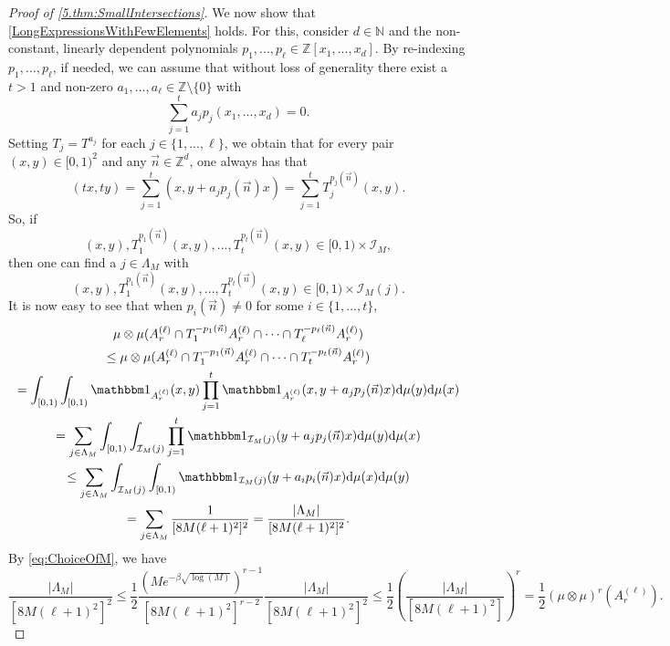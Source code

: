\documentclass[11pt,american,preprint]{elsarticle}
\numberwithin{equation}{section}
\theoremstyle{plain}
\theoremstyle{plain*}
\theoremstyle{plain}
\theoremstyle{plain*}
\theoremstyle{plain}
\theoremstyle{plain*}
\theoremstyle{remark}
\theoremstyle{remark*}
\theoremstyle{remark}
\theoremstyle{remark*}
\theoremstyle{remark}
\theoremstyle{remark*}
\theoremstyle{plain}
\theoremstyle{definition}
\theoremstyle{plain}
\theoremstyle{plain} %
\newcommand{\N}{\mathbb{N}}
\newcommand{\Z}{\mathbb{Z}}
\begin{document}
\begin{proof}[Proof of \cref{5.thm:SmallIntersections}]
We now show that \eqref{LongExpressionsWithFewElements} holds. For this, consider  $d\in\N$ and  the  non-constant, linearly dependent polynomials $p_1,...,p_\ell\in\Z[x_1,...,x_d]$. By re-indexing $p_1,...,p_\ell$, if needed, we can assume that without loss of generality there exist a $t>1$ and non-zero $a_1,...,a_\ell\in\Z\setminus\{0\}$ with
$$
\sum_{j=1}^ta_jp_j(x_1,...,x_d)=0.
$$
Setting $T_j=T^{a_j}$ for each $j\in\{1,...,\ell\}$, we obtain that for every pair $(x,y)\in [0,1)^2$ and any $\vec n\in\Z^d$, one always has that
\begin{equation}
(tx,ty)=\sum_{j=1}^t(x,y+a_jp_j(\vec n)x)=\sum_{j=1}^t T_j^{p_j(\vec n)}(x,y).      
\end{equation}
So, if 
\begin{equation}
(x,y), T_1^{p_1(\vec n)}(x,y),...,T_t^{p_t(\vec n)}(x,y)\in [0,1)\times \mathcal I_M,       
\end{equation}
then one can find a $j\in\Lambda_M$ with 
\begin{equation}
(x,y), T_1^{p_1(\vec n)}(x,y),...,T_t^{p_t(\vec n)}(x,y)\in [0,1)\times \mathcal I_M(j).    
\end{equation}
It is now easy to see that when $p_i(\vec n)\neq 0$ for some $i\in\{1,...,t\}$,
\begin{multline}\label{eq:KeyComputationForLDpolys}
    \mu\otimes\mu(A_r^{(\ell)}\cap T_1^{-p_1(\vec n)}A_r^{(\ell)}\cap \cdots\cap T_\ell^{-p_\ell(\vec n)}A_r^{(\ell)}) \\
    \leq \mu\otimes\mu(A_r^{(\ell)}\cap T_1^{-p_1(\vec n)}A_r^{(\ell)}\cap \cdots\cap T_t^{-p_t(\vec n)}A_r^{(\ell)})\\
    =\int_{[0,1)}\int_{[0,1)}\mathbbm  1_{A_r^{(\ell)}}(x,y)\prod_{j=1}^t\mathbbm 1_{A_r^{(\ell)}}(x,y+a_jp_j(\vec n)x)\text{d}\mu(y)\text{d}\mu(x)\\
    =\sum_{j\in\Lambda_M}\int_{[0,1)}\int_{\mathcal I_M(j)}\prod_{j=1}^t\mathbbm 1_{\mathcal I_M(j)}(y+a_jp_j(\vec n)x)\text{d}\mu(y)\text{d}\mu(x)\\
    \leq \sum_{j\in\Lambda_M}\int_{\mathcal I_M(j)}\int_{[0,1)}\mathbbm 1_{\mathcal I_M(j)}(y+a_ip_i(\vec n)x)\text{d}\mu(x)\text{d}\mu(y)\\
    =\sum_{j\in\Lambda_M}\frac{1}{[8M(\ell+1)^2]^2}=\frac{|\Lambda_M|}{[8M(\ell+1)^2]^2}. 
\end{multline}
By \eqref{eq:ChoiceOfM}, we have 
$$
\frac{|\Lambda_M|}{[8M(\ell+1)^2]^2}\leq \frac{1}{2}\frac{(Me^{-\beta\sqrt{\log(M)}})^{r-1}}{[8M(\ell+1)^2]^{r-2}}\frac{|\Lambda_M|}{[8M(\ell+1)^2]^2}\leq \frac{1}{2}\left(\frac{|\Lambda_M|}{[8M(\ell+1)^2]}\right)^r=\frac{1}{2}(\mu\otimes\mu)^r(A_r^{(\ell)}).
$$
\end{proof}
\end{document}
